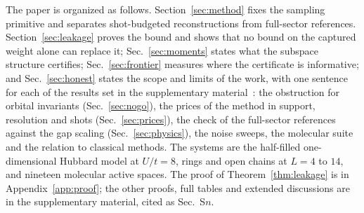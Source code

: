 The paper is organized as follows. Section~\ref{sec:method} fixes the sampling primitive and separates
shot-budgeted reconstructions from full-sector references. Section~\ref{sec:leakage}
proves the bound and shows that no bound on the captured weight alone can replace it;
Sec.~\ref{sec:moments} states what the subspace structure certifies; Sec.~\ref{sec:frontier} measures
where the certificate is informative; and Sec.~\ref{sec:honest} states the scope and limits of the
work, with one sentence for each of the results set in the supplementary material~\cite{supplemental}:
the obstruction for orbital invariants (Sec.~\ref{sec:nogo}), the prices of the method in support,
resolution and shots (Sec.~\ref{sec:prices}), the check of the full-sector references against the
gap scaling (Sec.~\ref{sec:physics}), the noise sweeps, the molecular suite and the relation to
classical methods. The systems are the half-filled
one-dimensional Hubbard model at $U/t=8$, rings and open chains at $L=4$ to $14$, and nineteen molecular
active spaces. The proof of Theorem~\ref{thm:leakage} is in Appendix~\ref{app:proof}; the other proofs,
full tables and extended discussions are in the supplementary material, cited as Sec.~S$n$.
